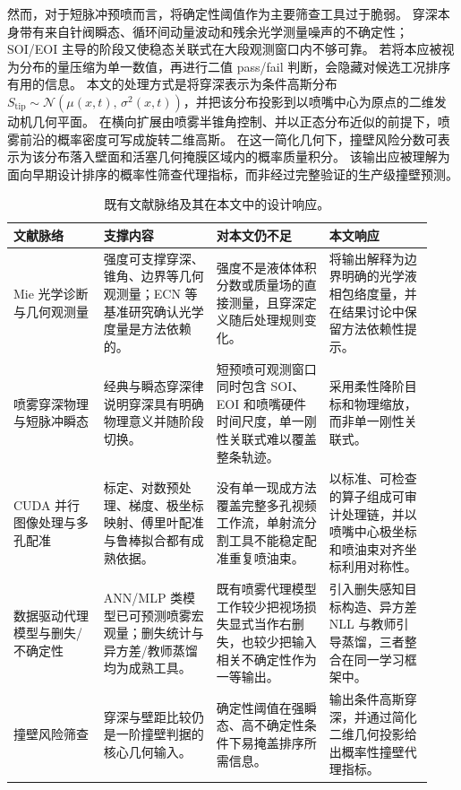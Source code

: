 \documentclass[english, 12pt, a4paper, elec, utf8, a-2b, online]{aaltothesis}
\begin{document}
\begin{CJK*}{UTF8}{gbsn}
然而，对于短脉冲预喷而言，将确定性阈值作为主要筛查工具过于脆弱。
穿深本身带有来自针阀瞬态、循环间动量波动和残余光学测量噪声的不确定性；SOI/EOI 主导的阶段又使稳态关联式在大段观测窗口内不够可靠。
若将本应被视为分布的量压缩为单一数值，再进行二值 pass/fail 判断，会隐藏对候选工况排序有用的信息。
本文的处理方式是将穿深表示为条件高斯分布 \(S_\mathrm{tip}\sim\mathcal{N}(\mu(x,t),\,\sigma^2(x,t))\)，并把该分布投影到以喷嘴中心为原点的二维发动机几何平面。
在横向扩展由喷雾半锥角控制、并以正态分布近似的前提下，喷雾前沿的概率密度可写成旋转二维高斯。
在这一简化几何下，撞壁风险分数可表示为该分布落入壁面和活塞几何掩膜区域内的概率质量积分。
该输出应被理解为面向早期设计排序的概率性筛查代理指标，而非经过完整验证的生产级撞壁预测。

\begin{table}[t]
\centering
\footnotesize
\setlength{\tabcolsep}{2pt}
\renewcommand{\arraystretch}{1.12}
\begin{tabular}{@{}L{0.20\linewidth}L{0.25\linewidth}L{0.25\linewidth}L{0.23\linewidth}@{}}
\toprule
文献脉络 & 支撑内容 & 对本文仍不足 & 本文响应 \\
\midrule
Mie 光学诊断与几何观测量 & 强度可支撑穿深、锥角、边界等几何观测量；ECN 等基准研究确认光学度量是方法依赖的。 & 强度不是液体体积分数或质量场的直接测量，且穿深定义随后处理规则变化。 & 将输出解释为边界明确的光学液相包络度量，并在结果讨论中保留方法依赖性提示。 \\
喷雾穿深物理与短脉冲瞬态 & 经典与瞬态穿深律说明穿深具有明确物理意义并随阶段切换。 & 短预喷可观测窗口同时包含 SOI、EOI 和喷嘴硬件时间尺度，单一刚性关联式难以覆盖整条轨迹。 & 采用柔性降阶目标和物理缩放，而非单一刚性关联式。 \\
CUDA 并行图像处理与多孔配准 & 标定、对数预处理、梯度、极坐标映射、傅里叶配准与鲁棒拟合都有成熟依据。 & 没有单一现成方法覆盖完整多孔视频工作流，单射流分割工具不能稳定配准重复喷油束。 & 以标准、可检查的算子组成可审计处理链，并以喷嘴中心极坐标和喷油束对齐坐标利用对称性。 \\
数据驱动代理模型与删失/不确定性 & ANN/MLP 类模型已可预测喷雾宏观量；删失统计与异方差/教师蒸馏均为成熟工具。 & 既有喷雾代理模型工作较少把视场损失显式当作右删失，也较少把输入相关不确定性作为一等输出。 & 引入删失感知目标构造、异方差 NLL 与教师引导蒸馏，三者整合在同一学习框架中。 \\
撞壁风险筛查 & 穿深与壁距比较仍是一阶撞壁判据的核心几何输入。 & 确定性阈值在强瞬态、高不确定性条件下易掩盖排序所需信息。 & 输出条件高斯穿深，并通过简化二维几何投影给出概率性撞壁代理指标。 \\
\bottomrule
\end{tabular}
\caption{既有文献脉络及其在本文中的设计响应。}
\label{tab:literature-synthesis-zh}
\end{table}


\end{CJK*}
\end{document}
